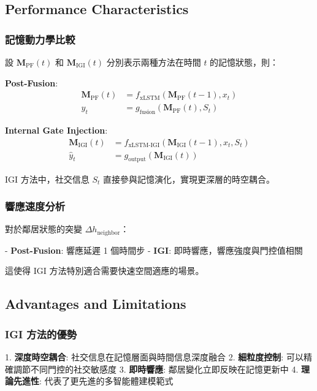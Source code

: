 \documentclass[11pt,a4paper]{article}
\begin{document}
\subsection{Performance Characteristics}

\subsubsection{記憶動力學比較}
設 $\mathbf{M}_{\text{PF}}(t)$ 和 $\mathbf{M}_{\text{IGI}}(t)$ 分別表示兩種方法在時間 $t$ 的記憶狀態，則：

\textbf{Post-Fusion}:
\begin{align}
\mathbf{M}_{\text{PF}}(t) &= f_{\text{xLSTM}}(\mathbf{M}_{\text{PF}}(t-1), x_t) \\
\hat{y}_t &= g_{\text{fusion}}(\mathbf{M}_{\text{PF}}(t), S_t)
\end{align}

\textbf{Internal Gate Injection}:
\begin{align}
\mathbf{M}_{\text{IGI}}(t) &= f_{\text{xLSTM-IGI}}(\mathbf{M}_{\text{IGI}}(t-1), x_t, S_t) \\
\hat{y}_t &= g_{\text{output}}(\mathbf{M}_{\text{IGI}}(t))
\end{align}

IGI 方法中，社交信息 $S_t$ 直接參與記憶演化，實現更深層的時空耦合。

\subsubsection{響應速度分析}
對於鄰居狀態的突變 $\Delta h_{\text{neighbor}}$：

- \textbf{Post-Fusion}: 響應延遲 1 個時間步
- \textbf{IGI}: 即時響應，響應強度與門控值相關

這使得 IGI 方法特別適合需要快速空間適應的場景。

\subsection{Advantages and Limitations}

\subsubsection{IGI 方法的優勢}
1. \textbf{深度時空耦合}: 社交信息在記憶層面與時間信息深度融合
2. \textbf{細粒度控制}: 可以精確調節不同門控的社交敏感度
3. \textbf{即時響應}: 鄰居變化立即反映在記憶更新中
4. \textbf{理論先進性}: 代表了更先進的多智能體建模範式
\end{document}
